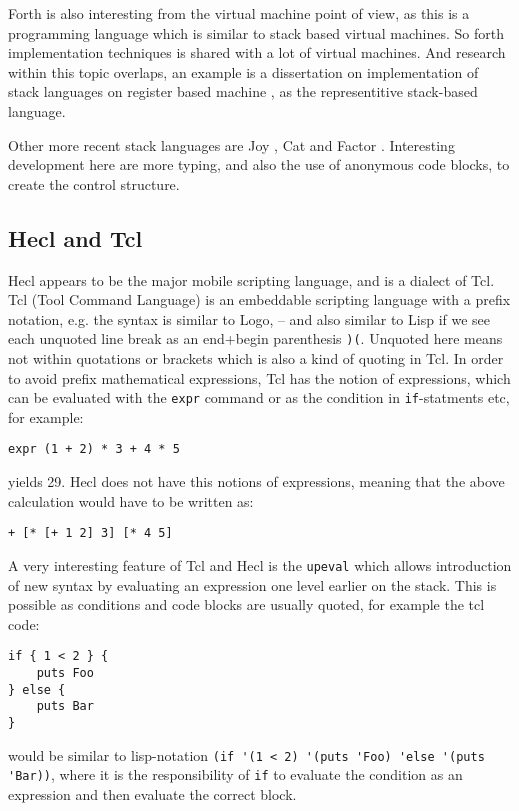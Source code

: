 \documentclass[11pt]{report}
\begin{document}
Forth is also interesting from the virtual machine point of view, as this is a programming language which is similar to stack based virtual machines. So forth implementation techniques is shared with a lot of virtual machines. And research within this topic overlaps, an example is a dissertation on implementation of stack languages on register based machine \cite{ertl-dissertation}, as the representitive stack-based language.

Other more recent stack languages are Joy \cite{joy-language}, Cat \cite{cat-language} and Factor \cite{factor-language}.
Interesting development here are more typing, and also the use of anonymous code blocks, 
to create the control structure.


\subsection{Hecl and Tcl}
Hecl appears to be the major mobile scripting language, and is a dialect of Tcl. 
Tcl (Tool Command Language) is an embeddable scripting language \cite{tclbook} with a prefix notation, e.g. the syntax is similar to Logo, -- and also similar to Lisp if we see each unquoted line break as an end+begin parenthesis \verb|)(|. Unquoted here means not within quotations or brackets which is also a kind of quoting in Tcl.
In order to avoid prefix mathematical expressions, Tcl has the notion of expressions, which can be evaluated with the \verb|expr| command or as the condition in \verb|if|-statments etc, for example:
\begin{verbatim}
expr (1 + 2) * 3 + 4 * 5
\end{verbatim}
yields 29. Hecl does not have this notions of expressions, meaning that the above calculation would have to be written as:
\begin{verbatim}
+ [* [+ 1 2] 3] [* 4 5]
\end{verbatim}

A very interesting feature of Tcl and Hecl is the \verb|upeval| which allows introduction of new syntax by evaluating an expression one level earlier on the stack. 
This is possible as conditions and code blocks are usually quoted, for example the tcl code:
\begin{verbatim}
if { 1 < 2 } {
    puts Foo
} else {
    puts Bar
}
\end{verbatim}
would be similar to lisp-notation \verb|(if '(1 < 2) '(puts 'Foo) 'else '(puts 'Bar))|, where it is the responsibility of \verb|if| to evaluate the condition as an expression and then evaluate the correct block. 
\end{document}
